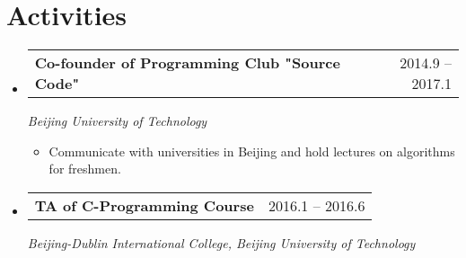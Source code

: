\documentclass[a4paper,11pt]{article}
\makeatletter
\newcommand{\resumeItem}[1]{
  \item\small{#1 \vspace{-2pt}}
}
\newcommand{\resumeSubheading}[3]{
  \vspace{-1pt}\item
    \begin{tabular*}{0.97\textwidth}{l@{\extracolsep{\fill}}r}
      \textbf{#1} & #2
      \end{tabular*}
      \textit{\small#3}
}
\newcommand{\resumeItemListStart}{\begin{itemize}[leftmargin=*, topsep=0ex]}
\newcommand{\resumeItemListEnd}{\end{itemize}}
\makeatother
\begin{document}
\section{Activities}
  \begin{itemize}[leftmargin=*, itemsep=-1pt, label={}]
    \resumeSubheading{Co-founder of Programming Club "Source Code"}{2014.9 -- 2017.1}{Beijing University of Technology}
      \resumeItemListStart
        \resumeItem {Communicate with universities in Beijing and hold lectures on algorithms for freshmen.}
      \resumeItemListEnd
    \resumeSubheading{TA of C-Programming Course}{2016.1 -- 2016.6}{Beijing-Dublin International College, Beijing University of Technology}
  \end{itemize}



\end{document}
